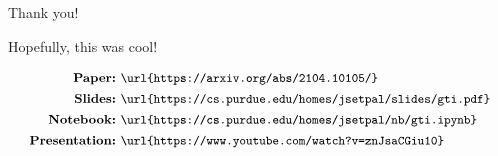\documentclass{beamer}
\begin{document}
\begin{frame}{Thank you!}
	\begin{center}
		Hopefully, this was cool!
	\end{center}
	\begin{align*}
		\textbf{\small Paper:}&~\texttt{\small\url{https://arxiv.org/abs/2104.10105/}} \\
		\textbf{\small Slides:}&~\texttt{\small\url{https://cs.purdue.edu/homes/jsetpal/slides/gti.pdf}} \\
		\textbf{\small Notebook:}&~\texttt{\small\url{https://cs.purdue.edu/homes/jsetpal/nb/gti.ipynb}} \\
		\textbf{\small Presentation:}&~\texttt{\small\url{https://www.youtube.com/watch?v=znJsaCGiu10}}
	\end{align*}
\end{frame}
\end{document}
